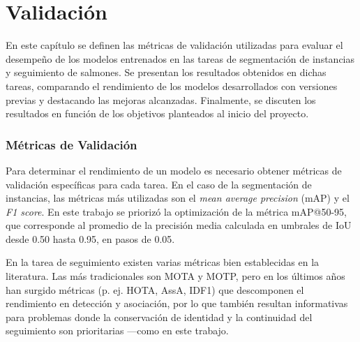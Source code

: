 
\part*{Validación}
En este capítulo se definen las métricas de validación utilizadas para evaluar el desempeño de los modelos entrenados en las tareas de segmentación de instancias y seguimiento de salmones. Se presentan los resultados obtenidos en dichas tareas, comparando el rendimiento de los modelos desarrollados con versiones previas y destacando las mejoras alcanzadas. Finalmente, se discuten los resultados en función de los objetivos planteados al inicio del proyecto.

\section{Métricas de Validación}
Para determinar el rendimiento de un modelo es necesario obtener métricas de validación específicas para cada tarea. En el caso de la segmentación de instancias, las métricas más utilizadas son el \textit{mean average precision} (mAP) y el \textit{F1 score}. En este trabajo se priorizó la optimización de la métrica mAP@50-95, que corresponde al promedio de la precisión media calculada en umbrales de IoU desde 0.50 hasta 0.95, en pasos de 0.05.

 En la tarea de seguimiento existen varias métricas bien establecidas en la literatura. Las más tradicionales son MOTA y MOTP, pero en los últimos años han surgido métricas (p. ej. HOTA, AssA, IDF1) que descomponen el rendimiento en detección y asociación, por lo que también resultan informativas para problemas donde la conservación de identidad y la continuidad del seguimiento son prioritarias ---como en este trabajo.


